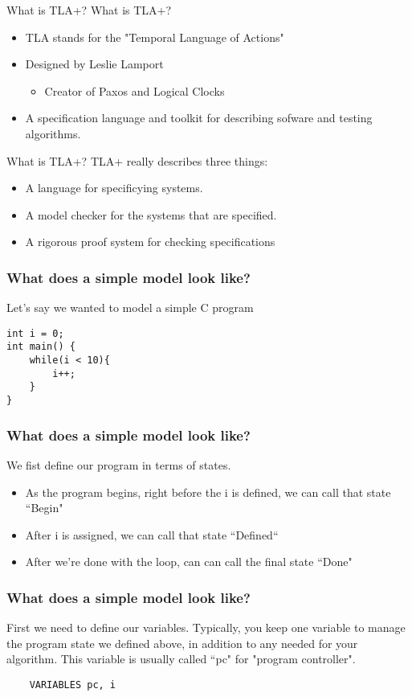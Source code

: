 \documentclass{beamer}
\begin{document}
\begin{frame}{What is TLA+?}
    What is TLA+? 
	\begin{itemize}
		\item TLA stands for the "Temporal Language of Actions"
		\item Designed by Leslie Lamport \begin{itemize}
				\item Creator of Paxos and Logical Clocks
		\end{itemize}
		\item A specification language and toolkit for describing sofware and testing algorithms.
	\end{itemize}
\end{frame}

\begin{frame}{What is TLA+?}
	TLA+ really describes three things: 
	\begin{itemize}
		\item A language for specificying systems.
		\item A model checker for the systems that are specified. 
		\item A rigorous proof system for checking specifications
	\end{itemize}
\end{frame}
\begin{frame}[fragile]
	\frametitle{What does a simple model look like? }
	Let's say we wanted to model a simple C program
\begin{lstlisting}
int i = 0; 
int main() {
    while(i < 10){
        i++;
    }
}
\end{lstlisting}


\end{frame}
\begin{frame}[fragile]
	\frametitle{What does a simple model look like?}
	We fist define our program in terms of states.  
	\begin{itemize}
		\item As the program begins, right before the i is defined, we can call that state ``Begin"
		\item After i is assigned, we can call that state ``Defined``
	        \item After we're done with the loop, can can call the final state ``Done"
	\end{itemize}
\end{frame}

\begin{frame}[fragile]
	\frametitle{What does a simple model look like?}
	First we need to define our variables.  Typically, you keep one variable to manage the program state we defined above, in addition to any needed for your algorithm.  This variable is usually called ``pc" for "program controller".

	\begin{lstlisting}
	VARIABLES pc, i
	\end{lstlisting}

\end{frame}
\end{document}
